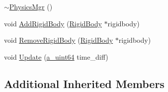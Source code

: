 \begin{DoxyCompactItemize}
\item 
\hyperlink{class_agmd_1_1_physics_mgr_abcf14beb1eb8d37f9126cdede01f9e6c}{$\sim$\+Physics\+Mgr} ()
\item 
void \hyperlink{class_agmd_1_1_physics_mgr_a8288fff05fd378dc5b8d1af1ce9b96b7}{Add\+Rigid\+Body} (\hyperlink{class_agmd_1_1_rigid_body}{Rigid\+Body} $\ast$rigidbody)
\item 
void \hyperlink{class_agmd_1_1_physics_mgr_ab8f2fe17bca890679583b682d0fe4f1f}{Remove\+Rigid\+Body} (\hyperlink{class_agmd_1_1_rigid_body}{Rigid\+Body} $\ast$rigidbody)
\item 
void \hyperlink{class_agmd_1_1_physics_mgr_acd83c345a83d3d5eebebb71d17548a7a}{Update} (\hyperlink{_common_defines_8h_a6c5192ec3c55d6e5b13d2dbaa082bdea}{a\+\_\+uint64} time\+\_\+diff)
\end{DoxyCompactItemize}
\subsection*{Additional Inherited Members}



